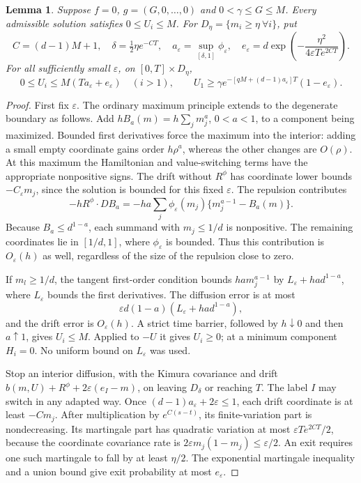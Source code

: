 \documentclass[11pt]{article}
\newtheorem{lemma}{Lemma}
\begin{document}
\begin{lemma}\label{localization}
Suppose $f=0$, $g=(G,0,\ldots,0)$ and $0<\gamma\le G\le M$. Every admissible solution satisfies $0\le U_i\le M$. For $D_\eta=\{m_i\ge\eta\ \forall i\}$, put
\[
 C=(d-1)M+1,\quad \delta=\tfrac12\eta e^{-CT},\quad
 a_\varepsilon=\sup_{[\delta,1]}\phi_\varepsilon,\quad
 e_\varepsilon=d\exp\left(-\frac{\eta^2}{4\varepsilon T e^{2CT}}\right).
\]
For all sufficiently small $\varepsilon$, on $[0,T]\times D_\eta$,
\begin{equation}\label{passive}
 0\le U_i\le M(Ta_\varepsilon+e_\varepsilon)\quad(i>1),\qquad
 U_1\ge\gamma e^{-[qM+(d-1)a_\varepsilon]T}(1-e_\varepsilon).
\end{equation}
\end{lemma}
\begin{proof}
First fix $\varepsilon$. The ordinary maximum principle extends to the degenerate boundary as follows. Add $hB_a(m)=h\sum_jm_j^a$, $0<a<1$, to a component being maximized. Bounded first derivatives force the maximum into the interior: adding a small empty coordinate gains order $h\rho^a$, whereas the other changes are $O(\rho)$. At this maximum the Hamiltonian and value-switching terms have the appropriate nonpositive signs. The drift without $R^\phi$ has coordinate lower bounds $-C_\varepsilon m_j$, since the solution is bounded for this fixed $\varepsilon$. The repulsion contributes
\[
 -hR^\phi\cdot DB_a=-ha\sum_j\phi_\varepsilon(m_j)\{m_j^{a-1}-B_a(m)\}.
\]
Because $B_a\le d^{1-a}$, each summand with $m_j\le1/d$ is nonpositive. The remaining coordinates lie in $[1/d,1]$, where $\phi_\varepsilon$ is bounded. Thus this contribution is $O_\varepsilon(h)$ as well, regardless of the size of the repulsion close to zero.

If $m_l\ge1/d$, the tangent first-order condition bounds
$ha m_j^{a-1}$ by $L_\varepsilon+ha d^{1-a}$, where $L_\varepsilon$ bounds the first derivatives. The diffusion error is at most
\[
 \varepsilon d(1-a)(L_\varepsilon+ha d^{1-a}),
\]
and the drift error is $O_\varepsilon(h)$. A strict time barrier, followed by $h\downarrow0$ and then $a\uparrow1$, gives $U_i\le M$. Applied to $-U$ it gives $U_i\ge0$; at a minimum component $H_i=0$. No uniform bound on $L_\varepsilon$ was used.

Stop an interior diffusion, with the Kimura covariance and drift
$b(m,U)+R^\phi+2\varepsilon(e_I-m)$, on leaving $D_\delta$ or reaching $T$. The label $I$ may switch in any adapted way. Once $(d-1)a_\varepsilon+2\varepsilon\le1$, each drift coordinate is at least $-Cm_j$. After multiplication by $e^{C(s-t)}$, its finite-variation part is nondecreasing. Its martingale part has quadratic variation at most $\varepsilon T e^{2CT}/2$, because the coordinate covariance rate is $2\varepsilon m_j(1-m_j)\le\varepsilon/2$. An exit requires one such martingale to fall by at least $\eta/2$. The exponential martingale inequality and a union bound give exit probability at most $e_\varepsilon$.


\end{proof}
\end{document}
